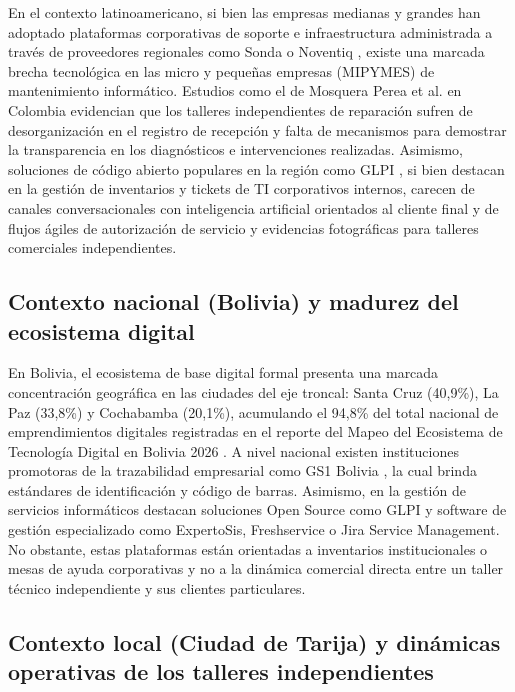 En el contexto latinoamericano, si bien las empresas medianas y grandes han adoptado plataformas corporativas de soporte e infraestructura administrada a través de proveedores regionales como Sonda o Noventiq \cite{sonda2024, noventiq2024}, existe una marcada brecha tecnológica en las micro y pequeñas empresas (MIPYMES) de mantenimiento informático. Estudios como el de Mosquera Perea et al. \cite{mosquera2025} en Colombia evidencian que los talleres independientes de reparación sufren de desorganización en el registro de recepción y falta de mecanismos para demostrar la transparencia en los diagnósticos e intervenciones realizadas. Asimismo, soluciones de código abierto populares en la región como GLPI \cite{glpi2024}, si bien destacan en la gestión de inventarios y tickets de TI corporativos internos, carecen de canales conversacionales con inteligencia artificial orientados al cliente final y de flujos ágiles de autorización de servicio y evidencias fotográficas para talleres comerciales independientes.

\subsection{Contexto nacional (Bolivia) y madurez del ecosistema digital}

En Bolivia, el ecosistema de base digital formal presenta una marcada concentración geográfica en las ciudades del eje troncal: Santa Cruz (40,9\%), La Paz (33,8\%) y Cochabamba (20,1\%), acumulando el 94,8\% del total nacional de emprendimientos digitales registradas en el reporte del Mapeo del Ecosistema de Tecnología Digital en Bolivia 2026 \cite{fundacion2026}. A nivel nacional existen instituciones promotoras de la trazabilidad empresarial como GS1 Bolivia \cite{gs1bolivia2026}, la cual brinda estándares de identificación y código de barras. Asimismo, en la gestión de servicios informáticos destacan soluciones Open Source como GLPI \cite{glpi2024} y software de gestión especializado como ExpertoSis, Freshservice o Jira Service Management. No obstante, estas plataformas están orientadas a inventarios institucionales o mesas de ayuda corporativas y no a la dinámica comercial directa entre un taller técnico independiente y sus clientes particulares.

\subsection{Contexto local (Ciudad de Tarija) y dinámicas operativas de los talleres independientes}


